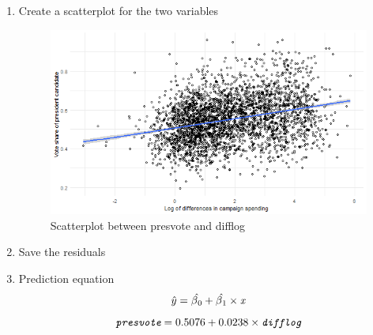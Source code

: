 \documentclass[12pt,letterpaper]{article}
\begin{document}
\begin{enumerate}
		\item Create a scatterplot for the two variables
			
			\begin{figure}[H]\centering
				\caption{\footnotesize Scatterplot between presvote and difflog}
				\label{fig:plot_1}
				\includegraphics[width=.85\textwidth]{2.2. Scatter_plot_presvote_difflog.png}
			\end{figure}
		
		\item Save the residuals
			
			
		\item Prediction equation
		$$\hat{y} = \hat{\beta\textsubscript{0}} + \hat{\beta\textsubscript{1}} \times \textit{x} $$
		$$ \textit{\texttt{presvote}} = 0.5076 + 0.0238 \times \textit{\texttt{difflog}}$$
	\end{enumerate}
\end{document}
